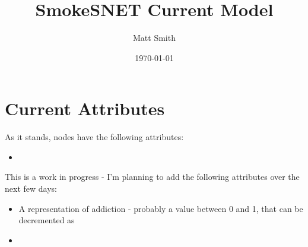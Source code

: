 \documentclass[]{article}
\begin{document}
\title{SmokeSNET Current Model}
\author{Matt Smith}
\date{\today}
\maketitle

\section{Current Attributes}
As it stands, nodes have the following attributes:
\begin{itemize}
\item 
\end{itemize}

This is a work in progress - I'm planning to add the following attributes over the next few days:
\begin{itemize}
\item A representation of addiction - probably a value between 0 and 1, that can be decremented as 
\item
\end{itemize}
\end{document}
